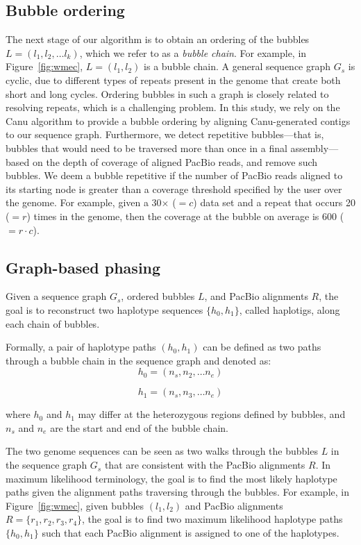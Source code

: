 \subsection{Bubble ordering}
The next stage of our algorithm is to obtain an ordering of the bubbles $L=(l_1, l_2, \ldots l_k)$, which we refer to as a \emph{bubble chain}. 
For example, in Figure~\ref{fig:wmec}, $L=(l_1, l_2)$ is a bubble chain.
A general sequence graph $G_s$ is cyclic, due to different types of repeats present in the genome that create both short and long cycles.
Ordering bubbles in such a graph is closely related to resolving repeats, which is a challenging problem.
In this study, we rely on the Canu algorithm \citep{koren2017canu} to provide a bubble ordering by aligning Canu-generated contigs to our sequence graph.
Furthermore, we detect repetitive bubbles---that is, bubbles that would need to be traversed more than once in a final assembly---based on the depth of coverage of aligned PacBio reads, and remove such bubbles.
We deem a bubble repetitive if the number of PacBio reads aligned to its starting node is greater than a coverage threshold specified by the user over the genome.
For example, given a 30$\times$ ($=c$) data set and a repeat that occurs 20 ($=r$) times in the genome, then the coverage at the bubble on average is 600 ($=r \cdot c$).

\subsection{Graph-based phasing}
\label{sec:phasing} 
Given a sequence graph $G_s$, ordered bubbles $L$, and PacBio alignments $R$, the goal is to reconstruct two haplotype sequences $\{h_0, h_1\}$, called haplotigs, along each chain of bubbles.
\begin{definition}
Formally, a pair of haplotype paths $(h_0, h_1)$ can be defined as two paths through a bubble chain in the sequence graph and denoted as:
\[h_0=(n_s, n_2, \ldots n_e )\]

\[h_1=(n_s, n_3, \ldots n_e )\]

where $h_0$ and $h_1$ may differ at the heterozygous regions defined by bubbles, and $n_s$ and $n_e$ are the start and end of the bubble chain.
\end{definition}

The two genome sequences can be seen as two walks through the bubbles $L$ in the sequence graph $G_s$ that are consistent with the PacBio alignments $R$.
In maximum likelihood terminology, the goal is to find the most likely haplotype paths given the alignment paths traversing through the bubbles.
For example, in Figure~\ref{fig:wmec}, given bubbles $(l_1, l_2)$ and PacBio alignments $R=\{r_1,r_2,r_3,r_4\}$, the goal is to find two maximum likelihood haplotype paths $\{h_0, h_1\}$ such that each PacBio alignment is assigned to one of the haplotypes. 


